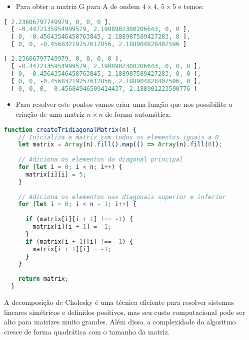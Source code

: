 \documentclass{article}
\begin{document}
\begin{itemize}
  \item Para obter a matriz G para A de ondem $4\times4$, $5\times5$ e temos:
\end{itemize}
\begin{lstlisting}[language=JavaScript, caption={Resuldado $4\times4$ }]
  [ 2.23606797749979, 0, 0, 0 ],
  [ -0.4472135954999579, 2.1908902300206643, 0, 0 ],
  [ 0, -0.45643546458763845, 2.188987589427283, 0 ],
  [ 0, 0, -0.45683219257612856, 2.188904828407596 ]
\end{lstlisting}
\begin{lstlisting}[language=JavaScript, caption={Resuldado $5\times5$ }]
  [ 2.23606797749979, 0, 0, 0, 0 ],
  [ -0.4472135954999579, 2.1908902300206643, 0, 0, 0 ],
  [ 0, -0.45643546458763845, 2.188987589427283, 0, 0 ],
  [ 0, 0, -0.45683219257612856, 2.188904828407596, 0 ],
  [ 0, 0, 0, -0.45684946509414437, 2.188901223500776 ]
\end{lstlisting}

\begin{itemize}
  \item Para resolver este pontos vamos criar uma função que nos possibilite a criação de uma matriz $n\times n$ de forma automática;
\end{itemize}
\begin{lstlisting}[language=JavaScript, caption={Matriz $n\times n$ }]
  function createTridiagonalMatrix(n) {
    // Inicializa a matriz com todos os elementos iguais a 0
    let matrix = Array(n).fill().map(() => Array(n).fill(0));
  
    // Adiciona os elementos da diagonal principal
    for (let i = 0; i < n; i++) {
      matrix[i][i] = 5;
    }
  
    // Adiciona os elementos nas diagonais superior e inferior
    for (let i = 0; i < n - 1; i++) {
      
      if (matrix[i][i + 1] !== -1) {
        matrix[i][i + 1] = -1;
      }
      if (matrix[i + 1][i] !== -1) {
        matrix[i + 1][i] = -1;
      }
    }
  
    return matrix;
  }
\end{lstlisting}
\bigskip
A decomposição de Cholesky é uma técnica eficiente para resolver sistemas lineares simétricos e definidos positivos, mas seu custo computacional pode ser alto para matrizes muito grandes. Além disso, a complexidade do algoritmo cresce de forma quadrática com o tamanho da matriz.
\end{document}
